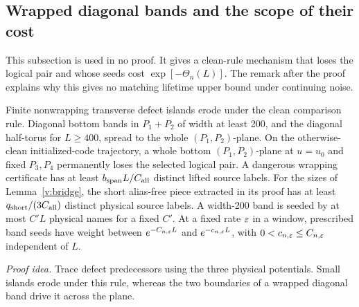 \subsection{Wrapped diagonal bands and the scope of their cost}\label{v:wrapped-section}
This subsection is used in no proof. It gives a clean-rule mechanism that loses the logical pair and whose seeds cost \(\exp[-\Theta_n(L)]\). The remark after the proof explains why this gives no matching lifetime upper bound under continuing noise.

\begin{lemma}\label{v:wrapped}
Finite nonwrapping transverse defect islands erode under the clean
comparison rule. Diagonal bottom bands in \(P_1+P_2\) of width at least
200, and the diagonal half-torus for \(L\ge400\), spread to the whole \((P_1,P_2)\)-plane. On the otherwise-clean
initialized-code trajectory, a whole bottom \((P_1,P_2)\)-plane at
\(u=u_0\) and fixed \(P_3,P_4\) permanently loses the
selected logical pair.
A dangerous wrapping certificate has at least \(b_{\rm span}L/C_{\rm all}\)
distinct lifted source labels. For the sizes of Lemma~\ref{v:bridge},
the short alias-free piece extracted in its proof has at least
\(q_{\rm short}/(3C_{\rm all})\) distinct physical source labels.
A width-200 band is seeded by at most \(C'L\) physical names for a fixed
\(C'\).
At a fixed rate \(\varepsilon\) in a window, prescribed band seeds have
weight between \(e^{-C_{n,\varepsilon}L}\) and \(e^{-c_{n,\varepsilon}L}\), with
\(0<c_{n,\varepsilon}\le C_{n,\varepsilon}\) independent of \(L\).
\end{lemma}
\par\noindent\emph{Proof idea.} Trace defect predecessors using the three physical potentials. Small islands erode under this rule, whereas the two boundaries of a wrapped diagonal band drive it across the plane.

